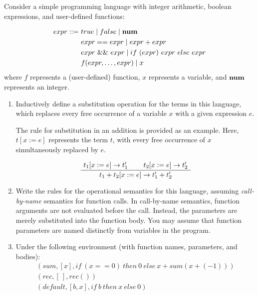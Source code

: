 \begin{exercise}{}

  Consider a simple programming language with integer arithmetic, boolean
  expressions, and user-defined functions:

  \begin{align*}
    expr ::= &~ true \mid false \mid \mathbf{num} \\
             &~ expr == expr \mid expr + expr \\
             &~ expr ~\&\& ~expr \mid if ~(expr) ~expr ~else ~expr \\
             &~ f(expr, \ldots, expr) \mid x
  \end{align*}
  where \(f\) represents a (user-defined) function, \(x\) represents a
  variable, and \(\mathbf{num}\) represents an integer.

  \begin{enumerate}
    \item Inductively define a substitution operation for the terms in this
      language, which replaces every free occurrence of a variable \(x\) with a
      given expression \(e\).

      The rule for substitution in an addition is provided as an example. Here,
      \(t[x := e]\) represents the term \(t\), with every free occurrence of \(x\)
      simultaneously replaced by \(e\).

      \begin{equation*}
        \AxiomC{\(t_1[x := e] \to t_1'\)}
        \AxiomC{\(t_2[x := e] \to t_2'\)}
        \BinaryInfC{\(t_1 + t_2[x := e] \to t_1' + t_2'\)}
        \DisplayProof
      \end{equation*}

    \item Write the rules for the operational semantics for this language,
    assuming \emph{call-by-name} semantics for function calls. In call-by-name
    semantics, function arguments are not evaluated before the call. Instead,
    the parameters are merely substituted into the function body. You may assume
    that function parameters are named distinctly from variables in the program.

    \item Under the following environment (with function names, parameters, and
    bodies):
      \begin{gather*}
        (sum, [x], if ~ (x == 0) ~ then ~ 0 ~ else ~ x + sum(x + (-1))) \\
        (rec, [~], rec()) \\
        (default, [b, x], if ~ b ~ then ~ x ~ else ~ 0)
      \end{gather*}


\end{enumerate}
\end{exercise}
